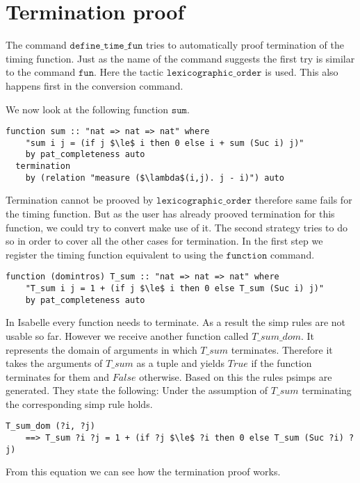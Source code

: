 

\section{Termination proof} \label{chapter:termination}

The command $\texttt{define\_time\_fun}$ tries to automatically proof termination of the timing function.
Just as the name of the command suggests the first try is similar to the command $\texttt{fun}$.
Here the tactic $\texttt{lexicographic\_order}$ is used.
This also happens first in the conversion command.

We now look at the following function $\texttt{sum}$.
\begin{lstlisting}[language=isabelle,mathescape=true]
  function sum :: "nat => nat => nat" where
    "sum i j = (if j $\le$ i then 0 else i + sum (Suc i) j)"
    by pat_completeness auto
  termination
    by (relation "measure ($\lambda$(i,j). j - i)") auto
\end{lstlisting}
Termination cannot be prooved by $\texttt{lexicographic\_order}$ therefore same fails for the timing function.
But as the user has already prooved termination for this function, we could try to convert make use of it.
The second strategy tries to do so in order to cover all the other cases for termination.
In the first step we register the timing function equivalent to using the $\texttt{function}$ command.
\begin{lstlisting}[language=isabelle,mathescape=true,caption=Function registration,label=lst:sum_reg]
  function (domintros) T_sum :: "nat => nat => nat" where
    "T_sum i j = 1 + (if j $\le$ i then 0 else T_sum (Suc i) j)"
    by pat_completeness auto
\end{lstlisting}
In Isabelle every function needs to terminate.
As a result the simp rules are not usable so far.
However we receive another function called $T\_sum\_dom$.
It represents the domain of arguments in which $T\_sum$ terminates.
Therefore it takes the arguments of $T\_sum$ as a tuple and yields $True$ if the function terminates for them and $False$ otherwise.
Based on this the rules psimps are generated.
They state the following: Under the assumption of $T\_sum$ terminating the corresponding simp rule holds.
\begin{lstlisting}[language=isabelle,mathescape=true,caption=T\_sum.psimps]
  T_sum_dom (?i, ?j)
    ==> T_sum ?i ?j = 1 + (if ?j $\le$ ?i then 0 else T_sum (Suc ?i) ?j)
\end{lstlisting}
From this equation we can see how the termination proof works.
